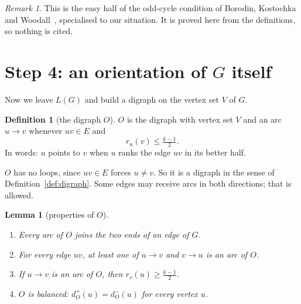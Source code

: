 \documentclass[11pt]{article}
\theoremstyle{plain}
\newtheorem{lemma}[theorem]{Lemma}
\theoremstyle{definition}
\newtheorem{definition}[theorem]{Definition}
\theoremstyle{remark}
\newtheorem{remark}[theorem]{Remark}
\newcommand{\LG}{L(G)}
\newcommand{\dout}{d^{+}}
\newcommand{\din}{d^{-}}
\newcommand{\half}{\tfrac{k-1}{2}}
\begin{document}
\begin{remark}
This is the easy half of the odd-cycle condition of Borodin, Kostochka and Woodall~\cite{bkw},
specialised to our situation. It is proved here from the definitions, so nothing is cited.
\end{remark}

\section{Step 4: an orientation of \texorpdfstring{$G$}{G} itself}\label{sec:step4}

Now we leave $\LG$ and build a digraph on the vertex set $V$ of $G$.

\begin{definition}[the digraph $O$]\label{def:O}
$O$ is the digraph with vertex set $V$ and an arc $u\to v$ whenever $uv\in E$ and
\[
  r_u(v)\le\half .
\]
In words: $u$ points to $v$ when $u$ ranks the edge $uv$ in its better half.
\end{definition}

$O$ has no loops, since $uv\in E$ forces $u\ne v$. So it is a digraph in the sense of
Definition~\ref{def:digraph}. Some edges may receive arcs in both directions; that is allowed.

\begin{lemma}[properties of $O$]\label{lem:O}
\begin{enumerate}[label=(\alph*)]
  \item Every arc of $O$ joins the two ends of an edge of $G$.
  \item For every edge $uv$, at least one of $u\to v$ and $v\to u$ is an arc of $O$.
  \item If $u\to v$ is an arc of $O$, then $r_v(u)\ge\half$.
  \item $O$ is balanced: $\dout_O(u)=\din_O(u)$ for every vertex $u$.
\end{enumerate}
\end{lemma}
\end{document}
